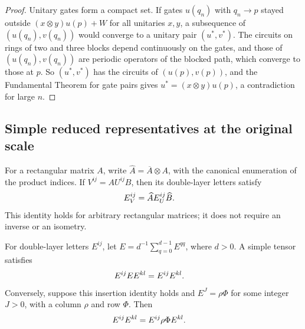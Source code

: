 \begin{proof}
    \leanok
    Unitary gates form a compact set. If gates $u(q_n)$ with $q_n\to p$
    stayed outside $(x\otimes y)u(p)+W$ for all unitaries $x,y$, a subsequence
    of $(u(q_n),v(q_n))$ would converge to a unitary pair $(u^*,v^*)$. The
    circuits on rings of two and three blocks depend continuously on the gates,
    and those of $(u(q_n),v(q_n))$ are periodic operators of the blocked path,
    which converge to those at $p$. So $(u^*,v^*)$ has the circuits of
    $(u(p),v(p))$, and the Fundamental Theorem for gate pairs gives
    $u^*=(x\otimes y)u(p)$, a contradiction for large $n$.
\end{proof}

\subsection{Simple reduced representatives at the original scale}

\begin{lemma}
    \label{lem:mpu_doubled_rectangular_bond_map}
    \leanok
    For a rectangular matrix $A$, write $\widehat A=\overline A\otimes A$,
    with the canonical enumeration of the product indices.
    If $V^{ij}=AU^{ij}B$, then its double-layer letters satisfy
    \begin{align}
        E_V^{ij} & =\widehat A E_U^{ij}\widehat B.
        \notag
    \end{align}
    This identity holds for arbitrary rectangular matrices; it does not
    require an inverse or an isometry.
\end{lemma}

\begin{lemma}
    \label{lem:mpu_normalized_diagonal_insertions}
    \leanok
    For double-layer letters $E^{ij}$, let
    $E=d^{-1}\sum_{q=0}^{d-1}E^{qq}$, where $d>0$.
    A simple tensor satisfies
    \begin{align}
        E^{ij} E E^{kl} & =E^{ij}E^{kl}.
        \notag
    \end{align}
    Conversely, suppose this insertion identity holds and
    $E^J=\rho\Phi$ for some integer $J>0$, with a column $\rho$ and row $\Phi$.
    Then
    \begin{align}
        E^{ij}E^{kl} & =E^{ij}\rho\Phi E^{kl}.
        \notag
    \end{align}
\end{lemma}

